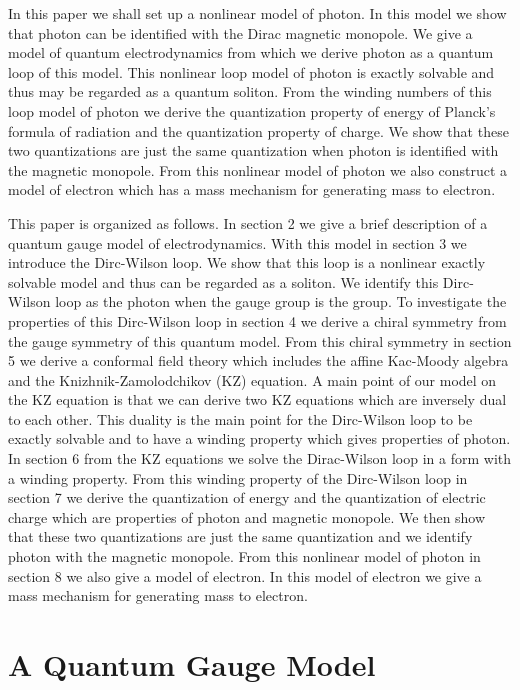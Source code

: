 \documentclass[a4paper,a4paper]{article}
\begin{document}
In this paper we shall set up a nonlinear model of photon. In this model we show that photon can be identified with the Dirac magnetic monopole. We give a model of quantum electrodynamics from which we derive photon as a quantum loop of this model. This nonlinear loop model of photon is exactly solvable and thus  may be regarded as a quantum soliton. From the winding numbers of this loop model of photon we derive the quantization property of energy of Planck's formula of radiation and the quantization property of charge. We show that these two quantizations are just the same quantization when photon is identified with the magnetic monopole. From this nonlinear model of photon we also construct a model of electron which has a mass mechanism for generating mass to electron.

This paper is organized as follows. In section 2
we give a brief description of a quantum gauge model
of electrodynamics. With this  model in section 3 we
introduce the Dirc-Wilson loop.  We show that this loop is a nonlinear 
exactly solvable model and thus can be regarded as a soliton. We identify this Dirc-Wilson loop as the photon when the gauge group is the \coordHE{} group. To investigate the properties of 
this Dirc-Wilson loop in section 4 we derive a chiral symmetry from
the gauge symmetry of this quantum  model.
From this chiral symmetry in section 5 we derive a conformal field theory which includes the affine Kac-Moody algebra
and the Knizhnik-Zamolodchikov (KZ) equation. A main point of our model on the KZ equation is that we can derive two KZ equations
which are inversely dual to each other. This duality is the main point for the Dirc-Wilson loop to be exactly solvable and to have a winding property which gives properties of photon. 
In section 6 from the KZ equations  we solve the  Dirac-Wilson loop in a form with a winding property.
 From this winding property of the Dirc-Wilson loop in section 7 we derive the quantization of energy and the quantization of electric charge which are properties of photon and magnetic monopole. We then show that these two quantizations are just the same quantization and we identify photon with the magnetic monopole.  From this nonlinear model of photon in section 8 we also give a model of electron. In this model of electron we give a mass mechanism for generating mass to electron. 

\section{A Quantum Gauge Model}\label{sec2}
\end{document}
